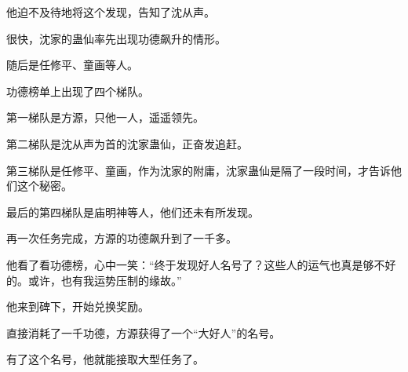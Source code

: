 \begin{this_body}
他迫不及待地将这个发现，告知了沈从声。

很快，沈家的蛊仙率先出现功德飙升的情形。

随后是任修平、童画等人。

功德榜单上出现了四个梯队。

第一梯队是方源，只他一人，遥遥领先。

第二梯队是沈从声为首的沈家蛊仙，正奋发追赶。

第三梯队是任修平、童画，作为沈家的附庸，沈家蛊仙是隔了一段时间，才告诉他们这个秘密。

最后的第四梯队是庙明神等人，他们还未有所发现。

再一次任务完成，方源的功德飙升到了一千多。

他看了看功德榜，心中一笑：“终于发现好人名号了？这些人的运气也真是够不好的。或许，也有我运势压制的缘故。”

他来到碑下，开始兑换奖励。

直接消耗了一千功德，方源获得了一个“大好人”的名号。

有了这个名号，他就能接取大型任务了。

\end{this_body}

